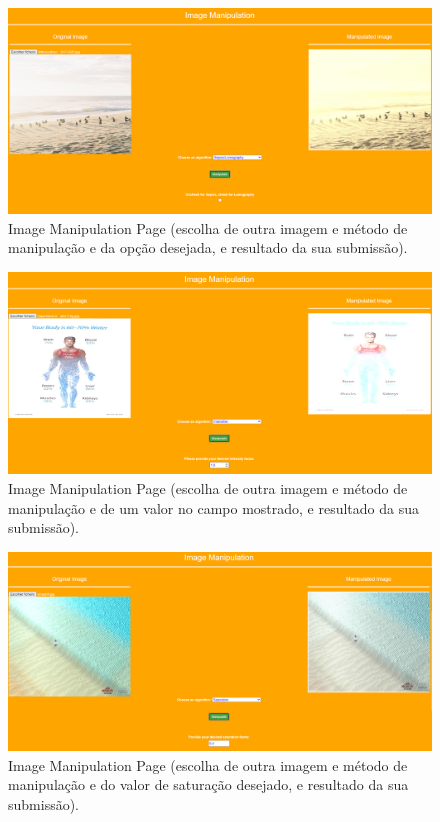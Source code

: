 \documentclass{report}
\begin{document}
    \begin{figure}[!hbtp]
        \centering 
        \includegraphics[scale=0.29]{Images_code/0 - image manipulation 8.png}
        \caption{\label{Image Manipulation}Image Manipulation Page (escolha de outra imagem e método de manipulação e da opção desejada, e resultado da sua submissão).}
    \end{figure}

    \begin{figure}[!hbtp]
        \centering 
        \includegraphics[scale=0.29]{Images_code/0 - image manipulation 9.png}
        \caption{\label{Image Manipulation}Image Manipulation Page (escolha de outra imagem e método de manipulação e de um valor no campo mostrado, e resultado da sua submissão).}
    \end{figure}

    \begin{figure}[!hbtp]
        \centering 
        \includegraphics[scale=0.29]{Images_code/0 - image manipulation 10.png}
        \caption{\label{Image Manipulation}Image Manipulation Page (escolha de outra imagem e método de manipulação e do valor de saturação desejado, e resultado da sua submissão).}
    \end{figure}
\end{document}
